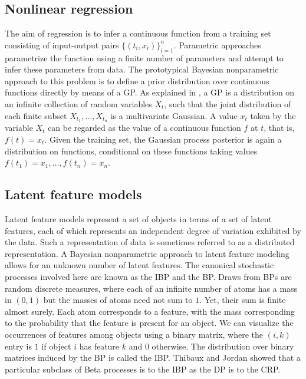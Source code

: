 \subsection{Nonlinear regression}
The aim of regression is to infer a continuous function from a training set consisting of input-output pairs $\{(t_i , x_i )\}_{i=1}^n$. Parametric approaches parametrize the function using a finite number of parameters and attempt to infer these parameters from data. The prototypical Bayesian nonparametric approach to this problem is to define a prior distribution over continuous functions directly by means of a \gls{GP}. As explained in \cite{Rasmussen:2005:GPM:1162254}, a \gls{GP} is a distribution on an infinite collection of random variables $X_t$, such that the joint distribution of each finite subset $X_{t_1},\dots, X_{t_n}$ is a multivariate Gaussian. A value $x_t$ taken by the variable $X_t$ can be regarded as the value of a continuous function $f$ at $t$, that is, $f(t) = x_t$. Given the training set, the Gaussian process posterior is again a distribution on functions, conditional on these functions taking values $f(t_1)=x_1,\dots,f(t_n)=x_n$.

\subsection{Latent feature models}
Latent feature models represent a set of objects in terms of a set of latent features, each of which represents an independent degree of variation exhibited by the data. Such a representation of data is sometimes referred to as a distributed representation. %
A Bayesian nonparametric approach to latent feature modeling allows for an unknown number of latent features.
The canonical stochastic processes involved here are known as the \gls{IBP} \cite{Ghahramani:2006tp,stick-breaking-ibp} and the \gls{BP}. Draws from \glspl{BP} are random discrete measures, where each of an infinite number of atoms has a mass in $(0,1)$ but the masses of atoms need not sum to $1$. Yet, their sum is finite almost surely. Each atom corresponds to a feature, with the mass corresponding to the probability that the feature is present for an object. We can visualize the occurrences of features among objects using a binary matrix, where the $(i,k)$ entry is $1$ if object $i$ has feature $k$ and $0$ otherwise. The distribution over binary matrices induced by the \gls{BP} is called the \gls{IBP}. Thibaux and Jordan \cite{journals/jmlr/ThibauxJ07} showed that a particular subclass of Beta processes is to the \gls{IBP} as the \gls{DP} is to the \gls{CRP}.


